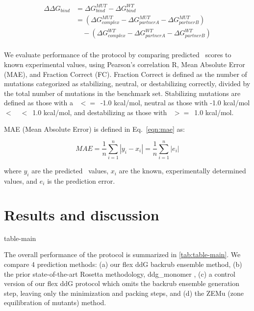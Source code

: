 \begin{equation}\label{eqn:split-ddg}
  \begin{split}
    {\Delta\Delta}G_{bind} & ={\Delta}G^{MUT}_{bind} - {\Delta}G^{WT}_{bind}\\
    & =({\Delta}G^{MUT}_{complex} - {\Delta}G^{MUT}_{partner A} - {\Delta}G^{MUT}_{partner B})\\
    & \quad - ({\Delta}G^{WT}_{complex} - {\Delta}G^{WT}_{partner A} - {\Delta}G^{WT}_{partner B})\\
  \end{split}
\end{equation}

We evaluate performance of the protocol by comparing predicted \ddg\ scores to known experimental values, using Pearson's correlation R, Mean Absolute Error (MAE), and Fraction Correct (FC). Fraction Correct is defined as the number of mutations categorized as stabilizing, neutral, or destabilizing correctly, divided by the total number of mutations in the benchmark set. Stabilizing mutations are defined as those with a \ddg\ $<=$\ -1.0 kcal/mol, neutral as those with -1.0 kcal/mol $<$\ \ddg\ $<$\ 1.0 kcal/mol, and destabilizing as those with \ddg\ $>=$\ 1.0 kcal/mol.

MAE (Mean Absolute Error) is defined in Eq.~\ref{eqn:mae} as:

\begin{equation}\label{eqn:mae}
  MAE = \dfrac{1}{n}\sum\limits_{i=1}^n|y_i-x_i| = \dfrac{1}{n}\sum\limits_{i=1}^n|e_i|
\end{equation}

where $y_i$ are the predicted \ddg\ values, $x_i$ are the known, experimentally determined values, and $e_i$ is the prediction error.

\section{Results and discussion}

{table-main}

The overall performance of the protocol is summarized in \cref{tab:table-main}.
We compare 4 prediction methods: (a) our flex ddG backrub ensemble method, (b) the prior state-of-the-art Rosetta methodology, ddg\_monomer \cite{kellogg_role_2011}, (c) a control version of our flex ddG protocol which omits the backrub ensemble generation step, leaving only the minimization and packing steps, and (d) the ZEMu (zone equilibration of mutants) method\cite{dourado_multiscale_2014}.

